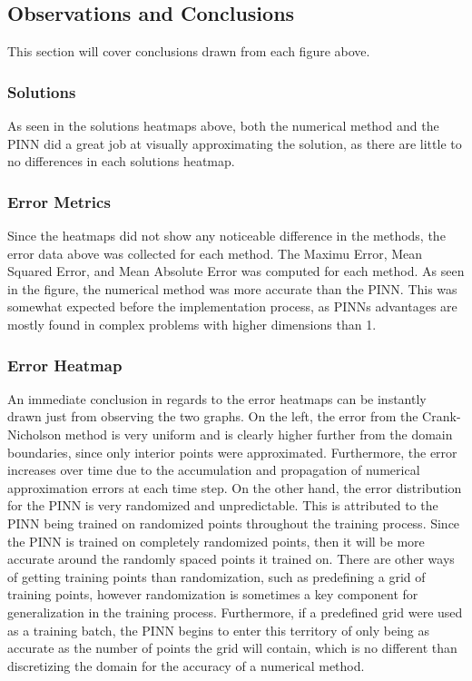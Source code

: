 \documentclass[12pt, reqno]{amsart}
\begin{document}
\subsection{Observations and Conclusions}
This section will cover conclusions drawn from each figure above.
\subsubsection{Solutions}
As seen in the solutions heatmaps above, both the numerical method and the PINN did a great job at visually approximating the solution, as there are little to no differences in each solutions heatmap.
\subsubsection{Error Metrics}
Since the heatmaps did not show any noticeable difference in the methods, the error data above was collected for each method. The Maximu Error, Mean Squared Error, and Mean Absolute Error was computed for each method. As seen in the figure, the numerical method was more accurate than the PINN. This was somewhat expected before the implementation process, as PINNs advantages are mostly found in complex problems with higher dimensions than 1.
\subsubsection{Error Heatmap}
An immediate conclusion in regards to the error heatmaps can be instantly drawn just from observing the two graphs. On the left, the error from the Crank-Nicholson method is very uniform and is clearly higher further from the domain boundaries, since only interior points were approximated. Furthermore, the error increases over time due to the accumulation and propagation of numerical approximation errors at each time step. On the other hand, the error distribution for the PINN is very randomized and unpredictable. This is attributed to the PINN being trained on randomized points throughout the training process. Since the PINN is trained on completely randomized points, then it will be more accurate around the randomly spaced points it trained on. There are other ways of getting training points than randomization, such as predefining a grid of training points, however randomization is sometimes a key component for generalization in the training process. Furthermore, if a predefined grid were used as a training batch, the PINN begins to enter this territory of only being as accurate as the number of points the grid will contain, which is no different than discretizing the domain for the accuracy of a numerical method. 
\end{document}
